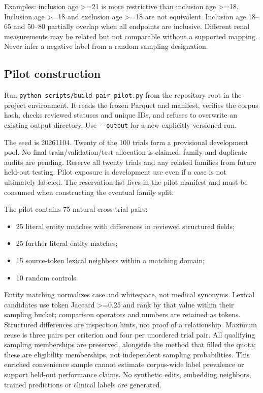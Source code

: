 \documentclass[10pt,letterpaper]{article}
\newcommand{\pathcode}[1]{\nolinkurl{#1}}
\begin{document}
Examples: inclusion age \textgreater=21 is more restrictive than inclusion age \textgreater=18. Inclusion age \textgreater=18 and exclusion age \textgreater=18 are not equivalent. Inclusion age 18--65 and 50--80 partially overlap when all endpoints are inclusive. Different renal measurements may be related but not comparable without a supported mapping. Never infer a negative label from a random sampling designation.

\subsection{Pilot construction}\label{contract01-pilot-construction}

Run \pathcode{python scripts/build_pair_pilot.py} from the repository root in the project environment. It reads the frozen Parquet and manifest, verifies the corpus hash, checks reviewed statuses and unique IDs, and refuses to overwrite an existing output directory. Use \pathcode{--output} for a new explicitly versioned run.

The seed is 20261104. Twenty of the 100 trials form a provisional development pool. No final train/validation/test allocation is claimed: family and duplicate audits are pending. Reserve all twenty trials and any related families from future held-out testing. Pilot exposure is development use even if a case is not ultimately labeled. The reservation list lives in the pilot manifest and must be consumed when constructing the eventual family split.

The pilot contains 75 natural cross-trial pairs:

\begin{itemize}
\item
  25 literal entity matches with differences in reviewed structured fields;
\item
  25 further literal entity matches;
\item
  15 source-token lexical neighbors within a matching domain;
\item
  10 random controls.
\end{itemize}

Entity matching normalizes case and whitespace, not medical synonyms. Lexical candidates use token Jaccard \textgreater=0.25 and rank by that value within their sampling bucket; comparison operators and numbers are retained as tokens. Structured differences are inspection hints, not proof of a relationship. Maximum reuse is three pairs per criterion and four per unordered trial pair. All qualifying sampling memberships are preserved, alongside the method that filled the quota; these are eligibility memberships, not independent sampling probabilities. This enriched convenience sample cannot estimate corpus-wide label prevalence or support held-out performance claims. No synthetic edits, embedding neighbors, trained predictions or clinical labels are generated.
\end{document}
